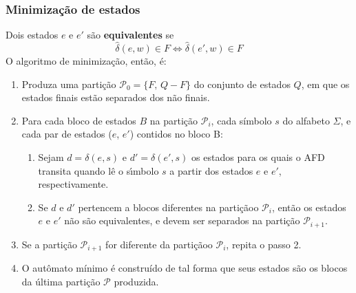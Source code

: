 \documentclass[11pt]{article}
\begin{document}
\subsubsection{Minimização de estados}
\label{sec:orgd357e0e}
Dois estados \(e\) e \(e'\) são \textbf{equivalentes} se
\[
  \hat{\delta}(e, w) \in F \iff \hat{\delta}(e', w) \in F
\]
O algoritmo de minimização, então, é:
\begin{enumerate}
\item Produza uma partição \(\mathcal{P}_0 = \{F,\, Q - F\}\) do conjunto de estados \(Q\),
em que os estados finais estão separados dos não finais.
\item Para cada bloco de estados \(B\) na partição \(\mathcal{P}_i\), cada símbolo \(s\) do
alfabeto \(\Sigma\), e cada par de estados (\(e\), \(e'\)) contidos no bloco B:
\begin{enumerate}
\item Sejam \(d = \delta(e, s)\) e \(d' = \delta(e' , s)\) os estados para os quais o AFD
transita quando lê o sı́mbolo \(s\) a partir dos estados \(e\) e \(e'\), respectivamente.
\item Se \(d\) e \(d'\) pertencem a blocos diferentes na partiçãoo \(\mathcal{P}_i\), então
os estados \(e\) e \(e'\) não são equivalentes, e devem ser separados na partição
\(\mathcal{P}_{i+1}\).
\end{enumerate}
\item Se a partição \(\mathcal{P}_{i+1}\) for diferente da partiçãoo \(\mathcal{P}_i\),
repita o passo 2.
\item O autômato mínimo é construído de tal forma que seus estados são os blocos da
última partição \(\mathcal{P}\) produzida.
\end{enumerate}
\end{document}
